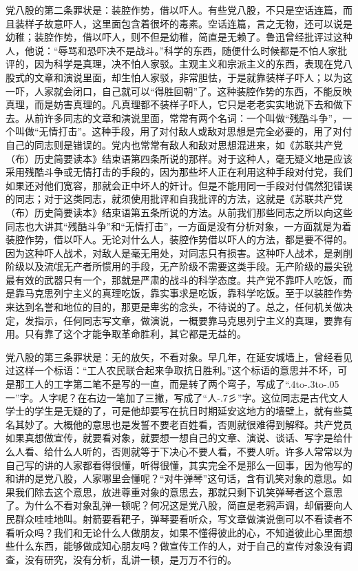 党八股的第二条罪状是：装腔作势，借以吓人。有些党八股，不只是空话连篇，而且装样子故意吓人，这里面包含着很坏的毒素。空话连篇，言之无物，还可以说是幼稚；装腔作势，借以吓人，则不但是幼稚，简直是无赖了。鲁迅曾经批评过这种人，他说：“辱骂和恐吓决不是战斗。”科学的东西，随便什么时候都是不怕人家批评的，因为科学是真理，决不怕人家驳。主观主义和宗派主义的东西，表现在党八股式的文章和演说里面，却生怕人家驳，非常胆怯，于是就靠装样子吓人；以为这一吓，人家就会闭口，自己就可以“得胜回朝”了。这种装腔作势的东西，不能反映真理，而是妨害真理的。凡真理都不装样子吓人，它只是老老实实地说下去和做下去。从前许多同志的文章和演说里面，常常有两个名词：一个叫做“残酷斗争”，一个叫做“无情打击”。这种手段，用了对付敌人或敌对思想是完全必要的，用了对付自己的同志则是错误的。党内也常常有敌人和敌对思想混进来，如《苏联共产党（布）历史简要读本》结束语第四条所说的那样。对于这种人，毫无疑义地是应该采用残酷斗争或无情打击的手段的，因为那些坏人正在利用这种手段对付党，我们如果还对他们宽容，那就会正中坏人的奸计。但是不能用同一手段对付偶然犯错误的同志；对于这类同志，就须使用批评和自我批评的方法，这就是《苏联共产党（布）历史简要读本》结束语第五条所说的方法。从前我们那些同志之所以向这些同志也大讲其“残酷斗争”和“无情打击”，一方面是没有分析对象，一方面就是为着装腔作势，借以吓人。无论对什么人，装腔作势借以吓人的方法，都是要不得的。因为这种吓人战术，对敌人是毫无用处，对同志只有损害。这种吓人战术，是剥削阶级以及流氓无产者所惯用的手段，无产阶级不需要这类手段。无产阶级的最尖锐最有效的武器只有一个，那就是严肃的战斗的科学态度。共产党不靠吓人吃饭，而是靠马克思列宁主义的真理吃饭，靠实事求是吃饭，靠科学吃饭。至于以装腔作势来达到名誉和地位的目的，那更是卑劣的念头，不待说的了。总之，任何机关做决定，发指示，任何同志写文章，做演说，一概要靠马克思列宁主义的真理，要靠有用。只有靠了这个才能争取革命胜利，其它都是无益的。

党八股的第三条罪状是：无的放矢，不看对象。早几年，在延安城墙上，曾经看见过这样一个标语：“工人农民联合起来争取抗日胜利。”这个标语的意思并不坏，可是那工人的工字第二笔不是写的一直，而是转了两个弯子，写成了“\lower.4\ccwd\hbox{\vbox{\centering\offinterlineskip\hbox to\kern-.3\ccwd\hbox to\kern-.05\ccwd\hbox{一}}}”字。人字呢？在右边一笔加了三撇，写成了“\hbox{人\kern-.7\ccwd\footnotesize 彡}”字。这位同志是古代文人学士的学生是无疑的了，可是他却要写在抗日时期延安这地方的墙壁上，就有些莫名其妙了。大概他的意思也是发誓不要老百姓看，否则就很难得到解释。共产党员如果真想做宣传，就要看对象，就要想一想自己的文章、演说、谈话、写字是给什么人看、给什么人听的，否则就等于下决心不要人看，不要人听。许多人常常以为自己写的讲的人家都看得很懂，听得很懂，其实完全不是那么一回事，因为他写的和讲的是党八股，人家哪里会懂呢？“对牛弹琴”这句话，含有讥笑对象的意思。如果我们除去这个意思，放进尊重对象的意思去，那就只剩下讥笑弹琴者这个意思了。为什么不看对象乱弹一顿呢？何况这是党八股，简直是老鸦声调，却偏要向人民群众哇哇地叫。射箭要看靶子，弹琴要看听众，写文章做演说倒可以不看读者不看听众吗？我们和无论什么人做朋友，如果不懂得彼此的心，不知道彼此心里面想些什么东西，能够做成知心朋友吗？做宣传工作的人，对于自己的宣传对象没有调查，没有研究，没有分析，乱讲一顿，是万万不行的。

